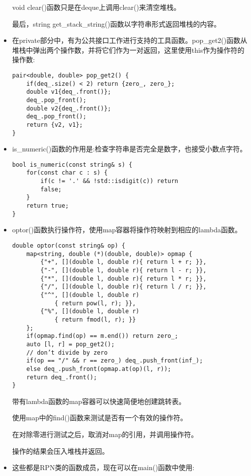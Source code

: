 \begin{itemize}
void clear()函数只是在deque上调用clear()来清空堆栈。

最后，string get\_stack\_string()函数以字符串形式返回堆栈的内容。

\item 
在private部分中，有为公共接口工作进行支持的工具函数。pop\_get2()函数从堆栈中弹出两个操作数，并将它们作为一对返回，这里使用this作为操作符的操作数:

\begin{lstlisting}[style=styleCXX]
pair<double, double> pop_get2() {
	if(deq_.size() < 2) return {zero_, zero_};
	double v1{deq_.front()};
	deq_.pop_front();
	double v2{deq_.front()};
	deq_.pop_front();
	return {v2, v1};
}
\end{lstlisting}

\item 
is\_numeric()函数的作用是:检查字符串是否完全是数字，也接受小数点字符。

\begin{lstlisting}[style=styleCXX]
bool is_numeric(const string& s) {
	for(const char c : s) {
		if(c != '.' && !std::isdigit(c)) return
		false;
	}
	return true;
}
\end{lstlisting}

\item 
optor()函数执行操作符，使用map容器将操作符映射到相应的lambda函数。

\begin{lstlisting}[style=styleCXX]
double optor(const string& op) {
	map<string, double (*)(double, double)> opmap {
		{"+", [](double l, double r){ return l + r; }},
		{"-", [](double l, double r){ return l - r; }},
		{"*", [](double l, double r){ return l * r; }},
		{"/", [](double l, double r){ return l / r; }},
		{"^", [](double l, double r)
			{ return pow(l, r); }},
		{"%", [](double l, double r)
			{ return fmod(l, r); }}
	};
	if(opmap.find(op) == m.end()) return zero_;
	auto [l, r] = pop_get2();
	// don’t divide by zero
	if(op == "/" && r == zero_) deq_.push_front(inf_);
	else deq_.push_front(opmap.at(op)(l, r));
	return deq_.front();
}
\end{lstlisting}

带有lambda函数的map容器可以快速简便地创建跳转表。

使用map中的find()函数来测试是否有一个有效的操作符。

在对除零进行测试之后，取消对map的引用，并调用操作符。

操作的结果会压入堆栈并返回。

\item 
这些都是RPN类的函数成员，现在可以在main()函数中使用:


\end{itemize}

